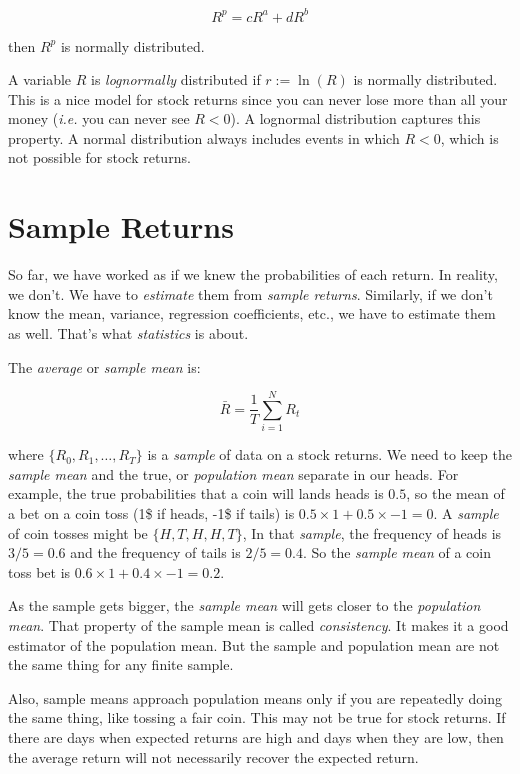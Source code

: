 \begin{equation}
    R^p = cR^a + dR^b
\end{equation}

then $R^p$ is normally distributed. 

A variable $R$ is \textit{lognormally} distributed 
if $r := \ln(R)$ is normally distributed.
This is a nice model for stock returns since you 
can never lose more than all your money (\textit{i.e.}
you can never see $R < 0$). A lognormal distribution
captures this property.
A normal distribution always includes events 
in which $R < 0$, which is not possible for stock returns.

\section{Sample Returns}

So far, we have worked as if we knew the probabilities
of each return. In reality, we don't. We have to
\textit{estimate} them from \textit{sample returns}.
Similarly, if we don't know the mean, variance, regression
coefficients, etc., we have to estimate them as well.
That's what \textit{statistics} is about.

The \textit{average} or \textit{sample mean} is:

\begin{equation}
    \bar{R} = \frac{1}{T}\sum_{i=1}^N R_t
\end{equation}

where $\{R_0, R_1, \ldots, R_{T}\}$ is a \textit{sample}
of data on a stock returns. We need to keep the 
\textit{sample mean} and the true, or \textit{population mean}
separate in our heads. For example, the true 
probabilities that a coin will lands heads is $0.5$, 
so the mean of a bet on a coin toss (1\$ if heads, -1\$ if tails)
is $0.5 \times 1 + 0.5 \times -1 = 0$.
A \textit{sample} of coin tosses might be $\{H, T, H, H, T\}$,
In that \textit{sample}, the frequency of heads is $3/5 = 0.6$ and 
the frequency of tails is $2/5 = 0.4$. So the \textit{sample mean}
of a coin toss bet is $0.6 \times 1 + 0.4 \times -1 = 0.2$.

As the sample gets bigger, the \textit{sample mean} 
will gets closer to the \textit{population mean}. 
That property of the sample mean is called \textit{consistency}.
It makes it a good estimator of the population mean.
But the sample and population mean are not the same thing 
for any finite sample.

Also, sample means approach population means only if 
you are repeatedly doing the same thing, like tossing
a fair coin. This may not be true for stock returns. 
If there are days when expected returns are high and
days when they are low, then the average return 
will not necessarily recover the expected return.



